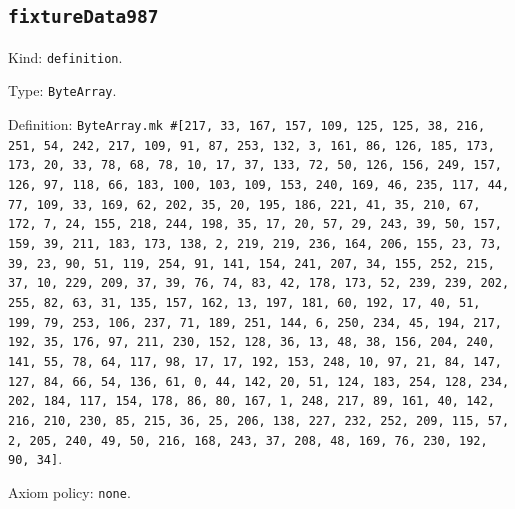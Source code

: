 \documentclass[11pt]{article}
\begin{document}
\subsection*{\texttt{fixtureData987}}
\noindent Kind: \texttt{definition}.\par
\noindent Type: \texttt{ByteArray}.\par
\noindent Definition: \texttt{ByteArray.mk \#[217, 33, 167, 157, 109, 125, 125, 38, 216, 251, 54, 242, 217, 109, 91, 87, 253, 132, 3, 161, 86, 126, 185, 173, 173, 20, 33, 78, 68, 78, 10, 17, 37, 133, 72, 50, 126, 156, 249, 157, 126, 97, 118, 66, 183, 100, 103, 109, 153, 240, 169, 46, 235, 117, 44, 77, 109, 33, 169, 62, 202, 35, 20, 195, 186, 221, 41, 35, 210, 67, 172, 7, 24, 155, 218, 244, 198, 35, 17, 20, 57, 29, 243, 39, 50, 157, 159, 39, 211, 183, 173, 138, 2, 219, 219, 236, 164, 206, 155, 23, 73, 39, 23, 90, 51, 119, 254, 91, 141, 154, 241, 207, 34, 155, 252, 215, 37, 10, 229, 209, 37, 39, 76, 74, 83, 42, 178, 173, 52, 239, 239, 202, 255, 82, 63, 31, 135, 157, 162, 13, 197, 181, 60, 192, 17, 40, 51, 199, 79, 253, 106, 237, 71, 189, 251, 144, 6, 250, 234, 45, 194, 217, 192, 35, 176, 97, 211, 230, 152, 128, 36, 13, 48, 38, 156, 204, 240, 141, 55, 78, 64, 117, 98, 17, 17, 192, 153, 248, 10, 97, 21, 84, 147, 127, 84, 66, 54, 136, 61, 0, 44, 142, 20, 51, 124, 183, 254, 128, 234, 202, 184, 117, 154, 178, 86, 80, 167, 1, 248, 217, 89, 161, 40, 142, 216, 210, 230, 85, 215, 36, 25, 206, 138, 227, 232, 252, 209, 115, 57, 2, 205, 240, 49, 50, 216, 168, 243, 37, 208, 48, 169, 76, 230, 192, 90, 34]}.\par
\noindent Axiom policy: \texttt{none}.\par
\end{document}
